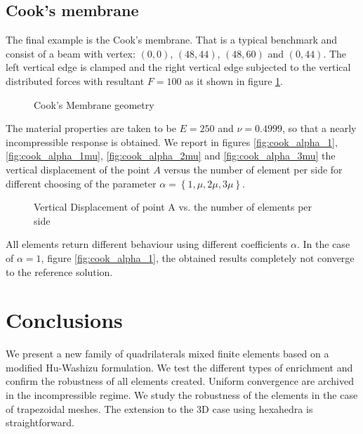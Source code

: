 \documentclass[preprint,12pt,authoryear]{elsarticle}
\begin{document}
\subsection{Cook's membrane}
The final example is the Cook's membrane. That is a typical benchmark and consist of a beam with vertex: $(0,0)$, $(48,44)$, $(48,60)$ and $(0,44)$.
The left vertical edge is clamped and the right vertical edge subjected to the vertical distributed forces with resultant $F=100$ as it shown in figure \ref{fig:cook}.
%
\begin{figure}[h!]
\begin{center}

\caption{Cook's Membrane geometry \label{fig:cook}}
\end{center}
\end{figure}
The material properties are taken to be $E = 250$ and $\nu = 0.4999$, so that a nearly incompressible response is obtained.
We report in figures \ref{fig:cook_alpha_1}, \ref{fig:cook_alpha_1mu}, \ref{fig:cook_alpha_2mu} and \ref{fig:cook_alpha_3mu} the vertical displacement of the point $A$ versus the number of element per side for different choosing of the parameter $\alpha=\left\lbrace 1, \mu, 2\mu, 3\mu \right\rbrace$.
\begin{figure}[h!]
\begin{center}
\subfigure[$\alpha=1$ \label{fig:cook_alpha_1}]
{}
\subfigure[$\alpha/ \mu=1$ \label{fig:cook_alpha_1mu}]
{}
\subfigure[$\alpha/ \mu=2$ \label{fig:cook_alpha_2mu}]
{}
\subfigure[$\alpha/ \mu=3$ \label{fig:cook_alpha_3mu}]
{}
\caption{Vertical Displacement of point A vs. 
the number of elements per side}
\end{center}
\end{figure}
All elements return different behaviour using different coefficients $\alpha$. In the case of $\alpha=1$, figure \ref{fig:cook_alpha_1}, the obtained results completely not converge to the reference solution.

\section{Conclusions}\label{sec:six}
We present a new family of quadrilaterals mixed finite elements based on a modified Hu-Washizu formulation.
We test the different types of enrichment and confirm the robustness of all elements created.
Uniform convergence are archived in the incompressible regime.
We study the robustness of the elements in the case of trapezoidal meshes.
The extension to the 3D case using hexahedra is straightforward. 
\end{document}
